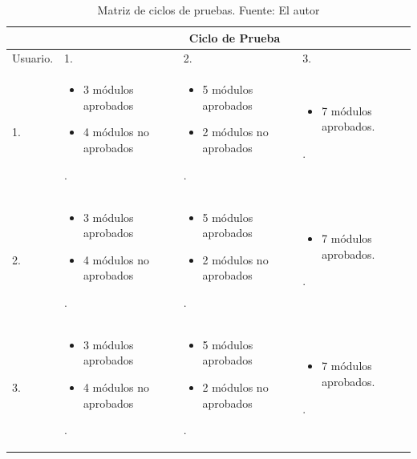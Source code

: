 \begin{table}[H]	
\begin{center}
\begin{tabular}{ | m{2cm} | m{4.5cm} | m{4.5cm}| m{4.5cm}| } 
 \hline
  & \multicolumn{3}{|c|}{Ciclo de Prueba}  \\
 \hline
 Usuario. & 1. & 2. & 3.\\
 \hline
 1. 
 & 
 \begin{itemize}
 	\item 3 módulos aprobados
 	\item 4 módulos no aprobados
 \end{itemize}. 
 & 
 \begin{itemize}
 	\item 5 módulos aprobados
 	\item 2 módulos no aprobados
 \end{itemize}.
 & 
 \begin{itemize}
 	\item 7 módulos aprobados.
 \end{itemize}.\\
 \hline
 2. 
 & 
 \begin{itemize}
 	\item 3 módulos aprobados
 	\item 4 módulos no aprobados
 \end{itemize}. 
 & 
 \begin{itemize}
 	\item 5 módulos aprobados
 	\item 2 módulos no aprobados
 \end{itemize}.
 & 
 \begin{itemize}
 	\item 7 módulos aprobados.
 \end{itemize}.\\
 \hline
 3. 
 & 
 \begin{itemize}
 	\item 3 módulos aprobados
 	\item 4 módulos no aprobados
 \end{itemize}. 
 & 
 \begin{itemize}
 	\item 5 módulos aprobados
 	\item 2 módulos no aprobados
 \end{itemize}.
 & 
 \begin{itemize}
 	\item 7 módulos aprobados.
 \end{itemize}.\\
 \hline
\end{tabular}
\caption{Matriz de ciclos de pruebas. Fuente: El autor}
\label{Tabla:10}
\end{center}
\end{table}


